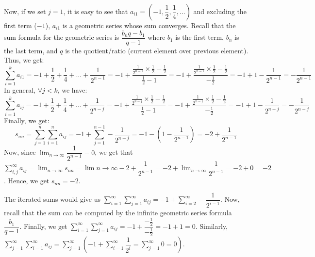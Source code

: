 \documentclass[11pt]{article}
\begin{document}
\begin{itemize}
        Now, if we set $j = 1$, it is easy to see that $a_{i1} = (-1,
        \dfrac{1}{2}, \dfrac{1}{4}, \dots)$ and excluding the first term
        ($-1$), $a_{i1}$ is a geometric series whose sum converges. Recall that
        the sum formula for the geometric series is $\dfrac{b_nq - b_1}{q - 1}$
        where $b_1$ is the first term, $b_n$ is the last term, and $q$ is the
        quotient/ratio (current element over previous element). Thus, we get:
        $$\sum_{i = 1}^k a_{i1} =  -1 + \dfrac{1}{2} + \dfrac{1}{4} + \dots +
        \dfrac{1}{2^{n - 1}} = -1 + \dfrac{\frac{1}{2^{n - 1}} \times
        \frac{1}{2} - \frac{1}{2}}{\frac{1}{2} - 1} = -1 + \dfrac{\frac{1}{2^{n
        - 1}} \times \frac{1}{2} - \frac{1}{2}}{-\frac{1}{2}} = -1 + 1 -
        \dfrac{1}{2^{n - 1}} = -\dfrac{1}{2^{n - 1}}$$
        In general, $\forall j < k$, we have:
        $$\sum_{i = 1}^k a_{ij} =  -1 + \dfrac{1}{2} + \dfrac{1}{4} + \dots +
        \dfrac{1}{2^{n - j}} = -1 + \dfrac{\frac{1}{2^{n - j}} \times
        \frac{1}{2} - \frac{1}{2}}{\frac{1}{2} - 1} = -1 + \dfrac{\frac{1}{2^{n
        - j}} \times \frac{1}{2} - \frac{1}{2}}{-\frac{1}{2}} = -1 + 1 -
        \dfrac{1}{2^{n - j}} = -\dfrac{1}{2^{n - j}}$$
        Finally, we get:
        $$s_{nn} = \sum_{j = 1}^{n}\sum_{i = 1}^{n} a_{ij} = -1 + \sum_{j =
        1}^{n - 1} -\dfrac{1}{2^{n - j}} = -1 - (1 - \dfrac{1}{2^{n - 1}}) = -2
        + \dfrac{1}{2^{n - 1}}$$
        Now, since $\lim_{n \to \infty} \dfrac{1}{2^{n - 1}} = 0$, we get that
        $\sum_{i, j}^\infty a_{ij} = \lim_{n \to \infty} s_{nn} = \lim{n \to
        \infty} -2 + \dfrac{1}{2^{n - 1}} = -2 + \lim_{n \to \infty}
        \dfrac{1}{2^{n - 1}} = -2 + 0 = -2$. Hence, we get $s_{nn} = -2$.

        The iterated sums would give us $\sum_{i = 1}^\infty\sum_{j = 1}^\infty
        a_{ij} = -1 + \sum_{i = 2}^\infty -\dfrac{1}{2^{i - 1}}$.  Now, recall
        that the sum can be computed by the infinite geometric series formula
        $\dfrac{b_1}{q - 1}$. Finally, we get $\sum_{i = 1}^\infty\sum_{j =
        1}^\infty a_{ij} = -1 + \dfrac{-\frac{1}{2}}{-\frac{1}{2}} = -1 + 1 =
        0$. Similarly, $\sum_{j = 1}^\infty\sum_{i = 1}^\infty a_{ij} = \sum_{j
        = 1}^\infty ( -1 + \sum_{i = 1}^\infty\dfrac{1}{2^i} = \sum_{j =
        1}^\infty 0 = 0)$.
\end{itemize}

\end{document}
